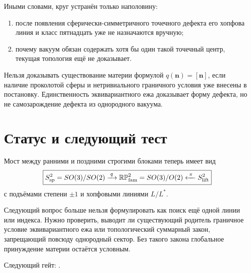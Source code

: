 Иными словами, круг устранён только наполовину:
\begin{enumerate}
 \item после появления сферически-симметричного точечного дефекта его
 хопфова линия и класс пятнадцать уже не назначаются вручную;
 \item почему вакуум обязан содержать хотя бы один такой точечный центр,
 текущая топология ещё не доказывает.
\end{enumerate}

\begin{nogocriterion}
Нельзя доказывать существование материи формулой $q(\mathbf n)=[\mathbf n]$,
если наличие проколотой сферы и нетривиального граничного условия уже
внесены в постановку. Единственность эквивариантного ежа доказывает форму
дефекта, но не самозарождение дефекта из однородного вакуума.
\end{nogocriterion}

\section{Статус и следующий тест}

Мост между ранними и поздними строгими блоками теперь имеет вид
\begin{equation}
 \boxed{
 S^2_{\rm sp}=SO(3)/SO(2)
 \xrightarrow{\;q\;}
 \mathbb{RP}^2_{\rm fam}=SO(3)/O(2)
 \xleftarrow{\;\pi\;}
 S^2_{\rm lift}}
\end{equation}
с подъёмами степени $\pm1$ и хопфовыми линиями $L/L^*$.

Следующий вопрос больше нельзя формулировать как поиск ещё одной линии или
индекса. Нужно проверить, выводит ли существующий родитель граничное
условие эквивариантного ежа или топологический суммарный закон, запрещающий
повсюду однородный сектор. Без такого закона глобальное принуждение материи
остаётся условным.

Следующий гейт:
.

